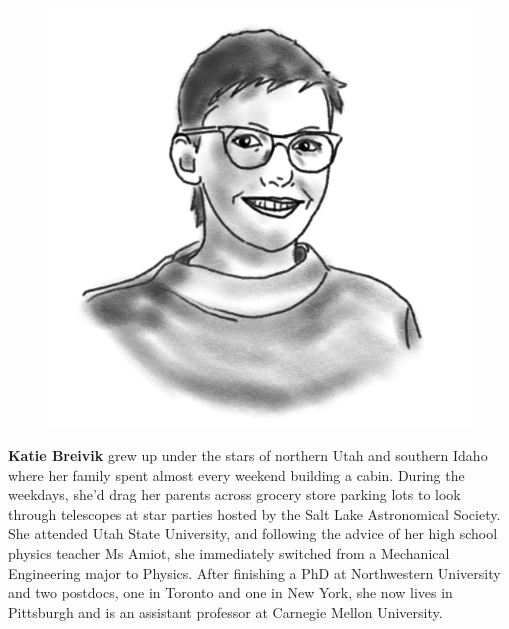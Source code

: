 
\begin{figure}
\vspace{25pt}
\includegraphics[width=0.9\linewidth]{portraits/katie.png}
\end{figure}
\textbf{Katie Breivik} grew up under the stars of northern Utah and southern Idaho where her family spent almost every weekend building a cabin. During the weekdays, she'd drag her parents across grocery store parking lots to look through telescopes at star parties hosted by the Salt Lake Astronomical Society. She attended Utah State University, and following the advice of her high school physics teacher Ms Amiot, she immediately switched from a Mechanical Engineering major to Physics. After finishing a PhD at Northwestern University and two postdocs, one in Toronto and one in New York, she now lives in Pittsburgh and is an assistant professor at Carnegie Mellon University.\\
\\


